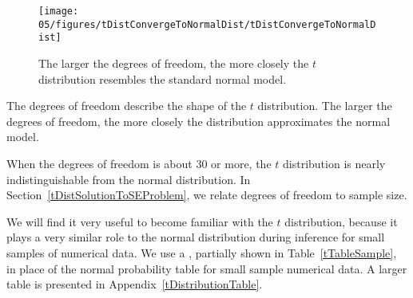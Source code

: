 \begin{figure}
\centering
\texttt{[image: 05/figures/tDistConvergeToNormalDist/tDistConvergeToNormalDist]}
\caption{The larger the degrees of freedom, the more closely the $t$ distribution resembles the standard normal model.}
\label{tDistConvergeToNormalDist}
\end{figure}

\begin{termBox}{
The degrees of freedom describe the shape of the $t$ distribution. The larger the degrees of freedom, the more closely the distribution approximates the normal model.}
\end{termBox}

When the degrees of freedom is about 30 or more, the $t$ distribution is nearly indistinguishable from the normal distribution. In Section~\ref{tDistSolutionToSEProblem}, we relate degrees of freedom to sample size.

We will find it very useful to become familiar with the $t$ distribution, because it plays a very similar role to the normal distribution during inference for small samples of numerical data. We use a , partially shown in Table~\ref{tTableSample}, in place of the normal probability table for small sample numerical data. A larger table is presented in Appendix~\vref{tDistributionTable}.

